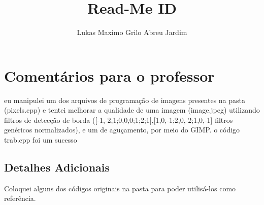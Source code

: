 \documentclass{article}
\title{Read-Me ID}
\author{Lukas Maximo Grilo Abreu Jardim}
\begin{document}
	\maketitle
	\newpage
	\section{Comentários para o professor}
	\vspace{5mm}
	eu manipulei um dos arquivos de programação de imagens presentes na pasta (pixels.cpp) e tentei melhorar a qualidade de uma imagem (image.jpeg) utilizando filtros de detecção de borda ([-1,-2,1;0,0,0;1;2;1],[1,0,-1;2,0,-2;1,0,-1] filtros genéricos normalizados), e um de aguçamento, por meio do GIMP.
	\vspace{5mm}
	o código trab.cpp foi um sucesso
	\vspace{5mm}
	\subsection{Detalhes Adicionais}
	\vspace{5mm}
	Coloquei alguns dos códigos originais na pasta para poder utilisá-los como referência.
\end{document}
